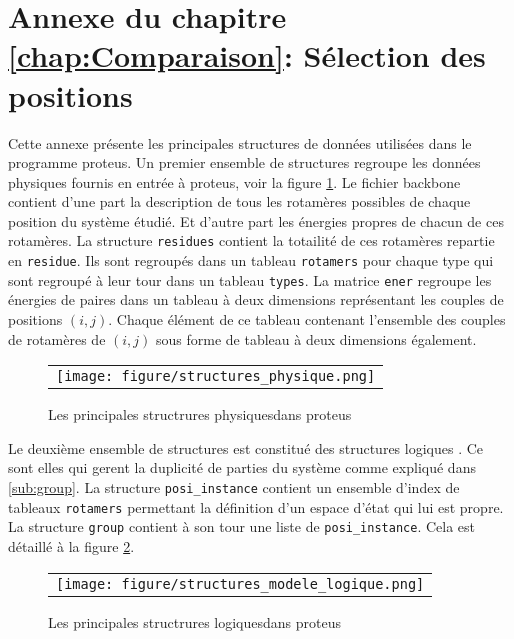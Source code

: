 \chapter*{Annexe du chapitre \ref{chap:Comparaison}: Sélection des positions }
\label{chap:annexeproteus}

Cette annexe présente les principales structures de données utilisées dans le programme proteus. Un premier ensemble de structures regroupe les données physiques fournis en entrée à proteus, voir la figure \ref{fig:structPhy}. Le fichier backbone contient d'une part la description de tous les rotamères possibles de chaque position du système étudié. Et d'autre part les énergies propres de chacun de ces rotamères. La structure \verb!residues! contient la totailité de ces rotamères repartie en \verb!residue!. Ils sont regroupés dans un tableau \verb!rotamers!  pour chaque type qui sont regroupé à leur tour dans un tableau \verb!types!. La matrice \verb!ener! regroupe les énergies de paires dans un tableau à deux dimensions représentant les couples de positions $(i,j)$. Chaque élément de ce tableau contenant l'ensemble des couples de rotamères de $(i,j)$  sous forme de tableau à deux dimensions également.

   \begin{figure}[!htbp]
     \centering
     \begin{tabular}{c}
       \texttt{[image: figure/structures\_physique.png]} 
     \end{tabular}
     
     \caption{Les principales structrures \og physiques\fg dans proteus}
\label{fig:structPhy}
   \end{figure}

 Le deuxième ensemble de structures est constitué des structures \og logiques \fg. Ce sont elles qui gerent la duplicité de parties du système comme expliqué dans \ref{sub:group}. La structure \verb!posi_instance! contient un ensemble d'index de tableaux \verb!rotamers! permettant la définition d'un espace d'état qui lui est propre. La structure \verb!group! contient à son tour une liste de \verb!posi_instance!. Cela est détaillé à la figure  \ref{fig:structLog}.   

 
   \begin{figure}[!htbp]
     \centering
     \begin{tabular}{c}
       \texttt{[image: figure/structures\_modele\_logique.png]} 
     \end{tabular}
     
     \caption{Les principales structrures \og logiques\fg dans proteus}
\label{fig:structLog}
   \end{figure}

